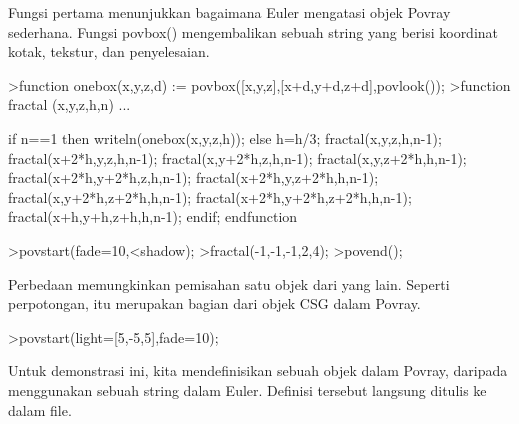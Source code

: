 \documentclass{article}
\begin{document}
\begin{eulernotebook}
\begin{eulercomment}
Fungsi pertama menunjukkan bagaimana Euler mengatasi objek Povray
sederhana. Fungsi povbox() mengembalikan sebuah string yang berisi
koordinat kotak, tekstur, dan penyelesaian.
\end{eulercomment}
\begin{eulerprompt}
>function onebox(x,y,z,d) := povbox([x,y,z],[x+d,y+d,z+d],povlook());
>function fractal (x,y,z,h,n) ...
\end{eulerprompt}
\begin{eulerudf}
   if n==1 then writeln(onebox(x,y,z,h));
   else
     h=h/3;
     fractal(x,y,z,h,n-1);
     fractal(x+2*h,y,z,h,n-1);
     fractal(x,y+2*h,z,h,n-1);
     fractal(x,y,z+2*h,h,n-1);
     fractal(x+2*h,y+2*h,z,h,n-1);
     fractal(x+2*h,y,z+2*h,h,n-1);
     fractal(x,y+2*h,z+2*h,h,n-1);
     fractal(x+2*h,y+2*h,z+2*h,h,n-1);
     fractal(x+h,y+h,z+h,h,n-1);
   endif;
  endfunction
\end{eulerudf}
\begin{eulerprompt}
>povstart(fade=10,<shadow);
>fractal(-1,-1,-1,2,4);
>povend();
\end{eulerprompt}
\begin{eulercomment}
Perbedaan memungkinkan pemisahan satu objek dari yang lain. Seperti
perpotongan, itu merupakan bagian dari objek CSG dalam Povray.
\end{eulercomment}
\begin{eulerprompt}
>povstart(light=[5,-5,5],fade=10);
\end{eulerprompt}
\begin{eulercomment}
Untuk demonstrasi ini, kita mendefinisikan sebuah objek dalam Povray,
daripada menggunakan sebuah string dalam Euler. Definisi tersebut
langsung ditulis ke dalam file.


\end{eulercomment}
\end{eulernotebook}
\end{document}
